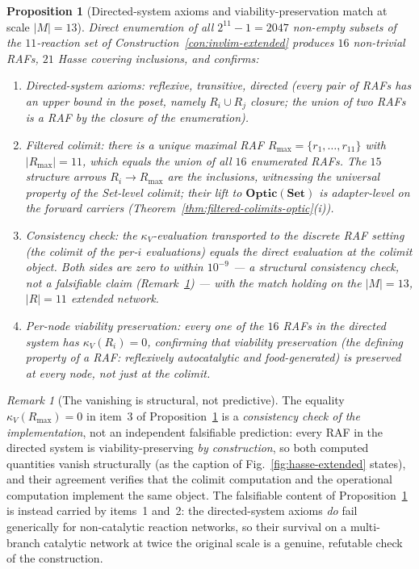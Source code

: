 \documentclass[11pt,a4paper]{article}
\theoremstyle{plain}
\newtheorem{proposition}[theorem]{Proposition}
\theoremstyle{definition}
\theoremstyle{remark}
\newtheorem{remark}[theorem]{Remark}
\newcommand{\kk}{\kappa_{\!V}}
\newcommand{\Optic}{\mathbf{Optic}}
\begin{document}
\begin{proposition}[Directed-system axioms and viability-preservation
match at scale $|M|=13$]
\label{prop:invlim-extended}
Direct enumeration of all $2^{11}-1=2047$ non-empty subsets of the
$11$-reaction set of Construction~\ref{con:invlim-extended} produces $16$ non-trivial
RAFs, $21$ Hasse covering inclusions, and confirms:
\begin{enumerate}[leftmargin=1.4em,itemsep=1pt]
\item \emph{Directed-system axioms}: reflexive, transitive, directed
  (every pair of RAFs has an upper bound in the poset, namely
  $R_i\cup R_j$ closure; the union of two RAFs is a RAF by the
  closure of the enumeration).
\item \emph{Filtered colimit}: there is a unique maximal RAF
  $R_{\max}=\{r_1,\ldots,r_{11}\}$ with $|R_{\max}|=11$, which
  equals the union of all $16$ enumerated RAFs. The $15$ structure
  arrows $R_i \to R_{\max}$ are the inclusions, witnessing the
  universal property of the Set-level colimit; their lift to
  $\Optic(\mathbf{Set})$ is adapter-level on the forward carriers
  (Theorem~\ref{thm:filtered-colimits-optic}(i)).
\item \emph{Consistency check}: the $\kk$-evaluation transported
  to the discrete RAF setting (the colimit of the per-$i$
  evaluations) equals the direct evaluation at the colimit object.
  Both sides are zero to within $10^{-9}$ --- a structural
  consistency check, not a falsifiable claim
  (Remark~\ref{rem:zero-zero}) --- with the match holding on the
  $|M|=13$, $|R|=11$ extended network.
\item \emph{Per-node viability preservation}: every one of the $16$
  RAFs in the directed system has $\kk(R_i)=0$, confirming that
  viability preservation (the defining property of a RAF: reflexively
  autocatalytic and food-generated) is preserved at every node, not
  just at the colimit.
\end{enumerate}
\end{proposition}

\begin{remark}[The vanishing is structural, not predictive]
\label{rem:zero-zero}
The equality $\kk(R_{\max})=0$ in item~3 of
Proposition~\ref{prop:invlim-extended} is a \emph{consistency check
of the implementation}, not an independent falsifiable prediction:
every RAF in the directed system is viability-preserving
\emph{by construction}, so both computed quantities vanish
structurally (as the caption of Fig.~\ref{fig:hasse-extended}
states), and their agreement verifies that the colimit computation
and the operational computation implement the same object. The
falsifiable content of Proposition~\ref{prop:invlim-extended} is
instead carried by items~1 and~2: the directed-system axioms
\emph{do} fail generically for non-catalytic reaction networks, so
their survival on a multi-branch catalytic network at twice the
original scale is a genuine, refutable check of the construction.
\end{remark}
\end{document}
